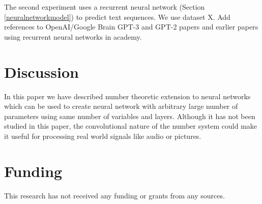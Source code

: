\documentclass[preprint,12pt]{elsarticle}
\begin{document}
The second experiment uses a recurrent neural network (Section \ref{neuralnetworkmodel}) to predict text sequences. We use dataset X. Add references to OpenAI/Google Brain GPT-3 and GPT-2 papers and earlier papers using recurrent neural networks in academy.

\section{Discussion}
\label{discussion1}

In this paper we have described number theoretic extension to neural networks which can be used to create neural network with arbitrary large number of parameters using same number of variables and layers. Although it has not been studied in this paper, the convolutional nature of the number system could make it useful for processing real world signals like audio or pictures. 


\section{Funding}

This research has not received any funding or grants from any sources.








{}
  


\end{document}
